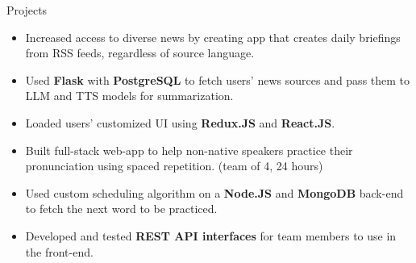 \documentclass{resume} %
\begin{document}
\begin{workSection}{Projects}
	\customItem[
	title=\href{https://github.com/AshkanArabim/news-briefer}{News Bridge (BorderHack 2024 submission) \faExternalLink},
	duration=September 2024,
	]
	\begin{itemize}
		\vspace{-0.5em}
		\itemsep -6pt {}
		\item Increased access to diverse news by creating app that creates daily briefings from RSS feeds, regardless of source language.
		\item Used \textbf{Flask} with \textbf{PostgreSQL} to fetch users' news sources and pass them to LLM and TTS models for summarization.
		\item Loaded users' customized UI using \textbf{Redux.JS} and \textbf{React.JS}.
	\end{itemize}
	
	
	\customItem[
	title=\href{https://devpost.com/software/vocowbulary-courses}{Vocabulary Courses (HackWesTX 2024 submission) \faExternalLink},
	duration=September 2024,
	]
	\begin{itemize}
		\vspace{-0.5em}
		\itemsep -6pt {}
		\item Built full-stack web-app to help non-native speakers practice their pronunciation using spaced repetition. (team of 4, 24 hours)
		\item Used custom scheduling algorithm on a \textbf{Node.JS} and \textbf{MongoDB} back-end to fetch the next word to be practiced.
		\item Developed and tested \textbf{REST API interfaces} for team members to use in the front-end.
	\end{itemize}
	
	

\end{workSection}
\end{document}
